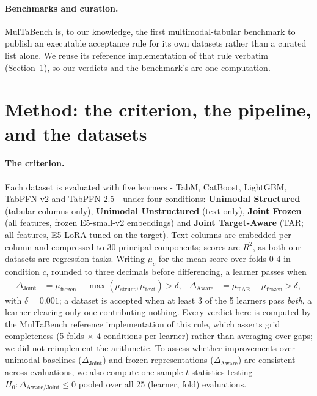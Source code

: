 \documentclass{article}
\newcommand{\djoint}{\Delta_{\text{Joint}}}
\newcommand{\daware}{\Delta_{\text{Aware}}}
\begin{document}
\paragraph{Benchmarks and curation.} MulTaBench \cite{multabench} is, to our knowledge, the
first multimodal-tabular benchmark to publish an executable acceptance rule for its own
datasets rather than a curated list alone. We reuse its reference implementation of that rule
verbatim (Section~\ref{sec:method}), so our verdicts and the benchmark's are one computation.

\section{Method: the criterion, the pipeline, and the datasets}
\label{sec:method}


\paragraph{The criterion.} Each dataset is evaluated with five learners - TabM, CatBoost,
LightGBM, TabPFN v2 and TabPFN-2.5 - under four conditions: \textbf{Unimodal Structured}
(tabular columns only), \textbf{Unimodal Unstructured} (text only), \textbf{Joint Frozen} (all
features, frozen E5-small-v2 embeddings) and \textbf{Joint Target-Aware} (TAR; all features,
E5 LoRA-tuned on the target). Text columns are embedded per column and compressed to 30
principal components; scores are $R^2$, as both our datasets are regression tasks. Writing
$\mu_c$ for the mean score over folds $0$-$4$ in condition $c$, rounded to three decimals
before differencing, a learner passes when
\begin{align}
\Delta_{\text{Joint}}
&= \mu_{\text{frozen}} - \max(\mu_{\text{struct}}, \mu_{\text{text}}) > \delta,
&
\Delta_{\text{Aware}}
&= \mu_{\text{TAR}} - \mu_{\text{frozen}} > \delta,
\end{align}
with $\delta = 0.001$; a dataset is accepted when at least 3 of the 5 learners pass
\emph{both}, a learner clearing only one contributing nothing. Every verdict here is computed
by the MulTaBench reference implementation of this rule, which asserts grid completeness
(5 folds $\times$ 4 conditions per learner) rather than averaging over gaps; we did not
reimplement the arithmetic.
To assess whether improvements over unimodal baselines ($\djoint$) and frozen representations ($\daware$) are consistent across evaluations, we also compute one-sample $t$-statistics testing $H_0: \Delta_{\text{Aware/Joint}} \le 0$ pooled over all 25 (learner, fold) evaluations.
\end{document}
